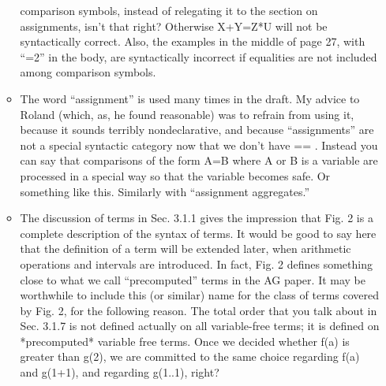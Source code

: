 \begin{itemize}
\begin{itemize}
  comparison symbols, instead of relegating it to the section on assignments,
  isn't that right? Otherwise X+Y=Z*U will not be syntactically correct. 
  Also, the examples in the middle of page 27, with “=2” in the body, are
  syntactically incorrect if equalities are not included among comparison
  symbols.
 \item
  The word ``assignment'' is used many times in the draft.  My advice to Roland
  (which, as, he found reasonable) was to refrain from using it, because it
  sounds terribly nondeclarative, and because “assignments” are not a special
  syntactic category now that we don't have == . Instead you can say that
  comparisons of the form A=B where A or B is a variable are processed in a
  special way so that the variable becomes safe.  Or something like this. 
  Similarly with ``assignment aggregates.''
 \item
  The discussion of terms in Sec. 3.1.1 gives the impression that Fig. 2 is a
  complete description of the syntax of terms.  It would be good to say here
  that the definition of a term will be extended later, when arithmetic
  operations and intervals are introduced.  In fact, Fig. 2 defines something
  close to what we call “precomputed” terms in the AG paper.  It may be
  worthwhile to include this (or similar) name for the class of terms covered
  by Fig. 2, for the following reason.  The total order that you talk about
  in Sec. 3.1.7 is not defined actually on all variable-free terms; it is
  defined on *precomputed* variable free terms.  Once we decided whether f(a)
  is greater than g(2), we are committed to the same choice regarding f(a)
  and g(1+1), and regarding g(1..1), right?
  
\end{itemize}
\end{itemize}

